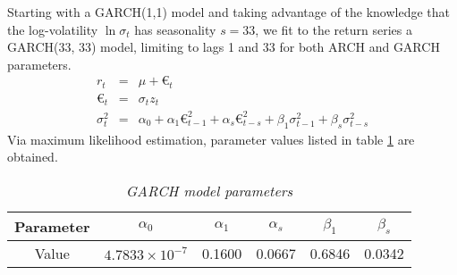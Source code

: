 Starting with a GARCH(1,1) model and taking advantage of the knowledge
that the log-volatility $\ln \sigma_t$ has seasonality $s=33$, we fit
to the return series a GARCH(33, 33) model, limiting to lags 1 and 33
for both ARCH and GARCH parameters.
\begin{eqnarray*}
  r_t &=& \mu + €_t \\
  €_t &=& \sigma_t z_t \\
  \sigma^2_t &=& \alpha_0 + \alpha_1 €^2_{t-1} + \alpha_s €^2_{t-s} +
  \beta_1 \sigma^2_{t-1} + \beta_s \sigma^2_{t-s}
\end{eqnarray*}
Via maximum likelihood estimation, parameter values listed in table
\ref{tab:nordea_15min_garch} are obtained.
\begin{table}[htb!]
  \centering
  \begin{tabular}{|c|c|c|c|c|c|}
    \hline
    Parameter & $\alpha_0$ & $\alpha_1$ & $\alpha_s$ & $\beta_1$ &
    $\beta_s$ \\
    \hline
    Value & $4.7833 \times 10^{-7}$ & 0.1600 & 0.0667 & 0.6846 &
    0.0342 \\
    \hline
  \end{tabular}
  \caption{\small \it GARCH model parameters}
  \label{tab:nordea_15min_garch}
\end{table}

